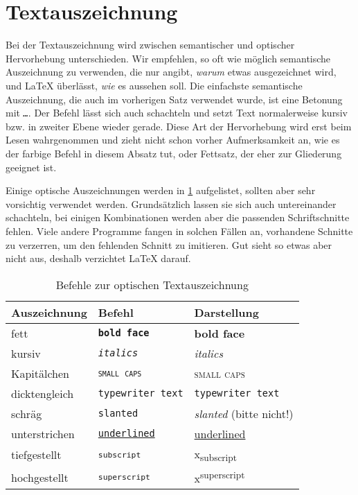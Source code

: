 \section{Textauszeichnung}

Bei der Textauszeichnung wird zwischen semantischer und optischer Hervorhebung unterschieden.
Wir empfehlen, so oft wie möglich semantische Auszeichnung zu verwenden, die nur angibt, \emph{warum} etwas ausgezeichnet wird, und \LaTeX{} überlässt, \emph{wie} es aussehen soll.
Die einfachste semantische Auszeichnung, die auch im vorherigen Satz verwendet wurde, ist eine Betonung mit \texttt{\emph{…}}.
Der Befehl lässt sich auch schachteln und setzt Text normalerweise kursiv bzw. in zweiter Ebene wieder gerade.
Diese Art der Hervorhebung wird erst beim Lesen wahrgenommen und zieht nicht schon vorher Aufmerksamkeit an, wie es der farbige Befehl in diesem Absatz tut, oder Fettsatz, der eher zur Gliederung geeignet ist.

Einige optische Auszeichnungen werden in \cref{tbl:visual-markup} aufgelistet, sollten aber sehr vorsichtig verwendet werden.
Grundsätzlich lassen sie sich auch untereinander schachteln, bei einigen Kombinationen werden aber die passenden Schriftschnitte fehlen.
Viele andere Programme fangen in solchen Fällen an, vorhandene Schnitte zu verzerren, um den fehlenden Schnitt zu imitieren.
Gut sieht so etwas aber nicht aus, deshalb verzichtet \LaTeX{} darauf.

\begin{table}[H]
	\center
	\begin{tabular}{lll}
		\toprule
		Auszeichnung & Befehl & Darstellung \\
		\midrule
		fett & \texttt{\textbf{bold face}} & \textbf{bold face} \\
		kursiv & \texttt{\textit{italics}} & \textit{italics} \\
		Kapitälchen & \texttt{\textsc{small caps}} & \textsc{small caps} \\
		dicktengleich & \texttt{\texttt{typewriter text}} & \texttt{typewriter text} \\
		schräg & \texttt{\texttt{slanted}} & \textsl{slanted} (bitte nicht!) \\
		unterstrichen & \texttt{\underline{underlined}} & \underline{underlined} \\
		tiefgestellt & \texttt{\textsubscript{subscript}} & x\textsubscript{subscript} \\
		hochgestellt & \texttt{\textsubscript{superscript}} & x\textsuperscript{superscript} \\
		\bottomrule
	\end{tabular}
	\caption{Befehle zur optischen Textauszeichnung}
	\label{tbl:visual-markup}
\end{table}

